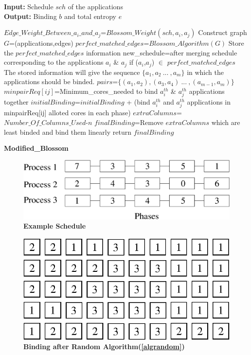 \documentclass[10pt, conference]{IEEEtran}
\begin{document}
\begin{algorithm}[tb]
\footnotesize
\textbf{Input:} Schedule $sch$ of the applications  \ \\
\textbf{Output:} Binding $b$ and total entropy $e$
\begin{algorithmic}[1]
\STATE $Edge\_Weight\_Between\_a_i\_and\_a_j$=$Blossom\_Weight(sch,a_i,a_j)$
\ENDFOR
\STATE Construct graph $G$=(applications,edges)
\STATE $perfect\_matched\_edges$=$Blossom\_Algorithm(G)$
\STATE Store the $perfect\_matched\_edges$ information
\STATE new\_schedule=after merging schedule corresponding to the applications $a_i$ \& $a_j$ if ($a_i$,$a_j$) $\in$ $perfect\_matched\_edges$
\ENDWHILE
\STATE The stored information will give the sequence $\{a_1, a_2\:...\:, a_{m}\}$ in which the applications should be binded.
\STATE $pairs$=$\{(a_1,a_2),(a_3,a_4)\:...\:, (a_{m-1},a_{m})\}$
\STATE $minpairReq[ij]$=Minimum\_cores\_needed to bind $a_i^{th}$ \& $a_j^{th}$ applications together
\STATE $initialBinding$=$initialBinding$ + (bind $a_i^{th}$ and $a_j^{th}$ applications in minpairReq[ij] alloted cores in each phase)
\ENDFOR
\STATE $extraColumns$=$Number\_Of\_Columns\_Used$-$n$
\STATE $finalBinding$=Remove $extraColumns$ which are least binded and bind them linearly
\STATE return $finalBinding$
\end{algorithmic}
\caption{\textbf{Modified\_Blossom}}
\vspace{-0.1cm}
\label{algBlossom}
\end{algorithm}


\iffalse
\begin{figure} [tb]
\centering
\includegraphics[scale=0.25]{figure/schedule.eps}
\caption{\textbf{Example Schedule}}
\label{imgschd}
\end{figure}

\begin{figure} [tb]
\centering
\includegraphics[scale=0.45]{figure/random_shuffle.eps}
\caption{\textbf{Binding after Random Algorithm(\ref{algrandom}) }}
\label{imgrandom}
\end{figure}
\end{document}
